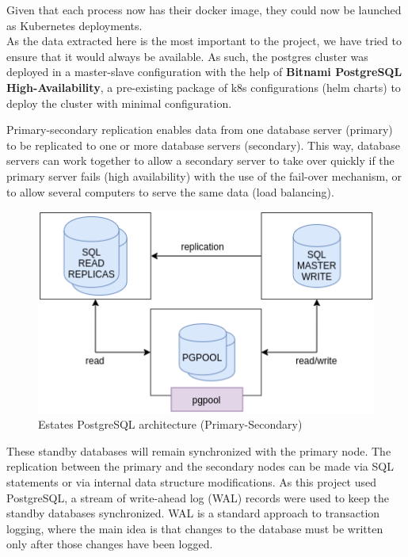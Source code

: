 Given that each process now has their docker image, they could now be launched as Kubernetes deployments. \\

As the data extracted here is the most important to the project, we have tried to ensure that it would always be available. As such, the postgres cluster was deployed in a master-slave configuration with the help of \textbf{Bitnami PostgreSQL High-Availability}, a pre-existing package of \acrshort{k8s} configurations (helm charts) to deploy the cluster with minimal configuration.

Primary-secondary replication enables data from one database server (primary) to be replicated to one or more database servers (secondary). This way, database servers can work together to allow a secondary server to take over quickly if the primary server fails (high availability) with the use of the fail-over mechanism, or to allow several computers to serve the same data (load balancing).

\begin{figure}[H]
	\centering
	\includegraphics[width=0.7\linewidth]{Chapters/img/4_realEstateData/BD_Estates.png}
	\caption{Estates PostgreSQL architecture (Primary-Secondary)}
	\label{fig:bd-estates}
\end{figure}

These standby databases will remain synchronized with the primary node. The replication between the primary and the secondary nodes can be made via SQL statements or via internal data structure modifications. As this project used PostgreSQL, a stream of write-ahead log (WAL) records were used to keep the standby databases synchronized. WAL is a standard approach to transaction logging, where the main idea is that changes to the database must be written only after those changes have been logged. 


